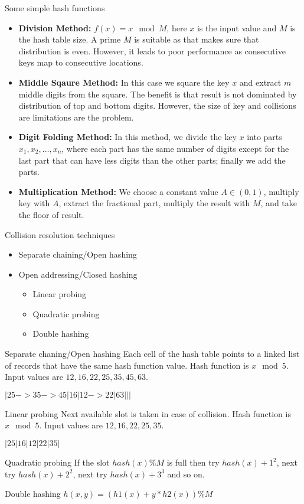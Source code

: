 \documentclass[aspectratio=169,8pt]{beamer}
\begin{document}
\begin{frame}{Some simple hash functions}
  \begin{itemize}
    \item {\bf Division Method:} $f(x) = x\mod M$, here $x$ is the input value and $M$ is the hash table
      size. A prime $M$ is suitable as that makes sure that distribution is even. However, it leads to poor
      performance as consecutive keys map to consecutive locations.
    \item {\bf Middle Sqaure Method:} In this case we square the key $x$ and extract $m$ middle digits from
      the square. The benefit is that result is not dominated by distribution of top and bottom
      digits. However, the size of key and collisions are limitations are the problem.
    \item {\bf Digit Folding Method:} In this method, we divide the key $x$ into parts $x_1, x_2, \ldots,
      x_n$, where each part has the same number of digits except for the last part that can have less digits
      than the other parts; finally we add the parts.
    \item {\bf Multiplication Method:} We choose a constant value $A\in(0, 1)$, multiply key with $A$,
      extract the fractional part, multiply the result with $M$, and take the floor of result.
  \end{itemize}
\end{frame}
\begin{frame}{Collision resolution techniques}
  \begin{itemize}
  \item Separate chaining/Open hashing
  \item Open addressing/Closed hashing
    \begin{itemize}
    \item Linear probing
    \item Quadratic probing
    \item Double hashing
    \end{itemize}
  \end{itemize}
\end{frame}
\begin{frame}{Separate chaning/Open hashing}
  Each cell of the hash table points to a linked list of records that have the same hash
  function value. Hash function is $x \mod 5$. Input values are $12, 16, 22, 25, 35, 45, 63$.

  $|25->35->45|16|12 -> 22|63|||$
\end{frame}
\begin{frame}{Linear probing}
  Next available slot is taken in case of collision. Hash function is $x \mod 5$. Input values are $12, 16,
  22, 25, 35$.

  $|25|16|12|22|35|$
\end{frame}
\begin{frame}{Quadratic probing}
  If the slot $hash(x)\%M$ is full then try $hash(x) + 1^2$, next try $hash(x) + 2^2$, next try $hash(x) +
  3^3$ and so on.
\end{frame}
\begin{frame}{Double hashing}
  $h(x, y) = (h1(x) + y * h2(x)) \% M$
\end{frame}
\end{document}
